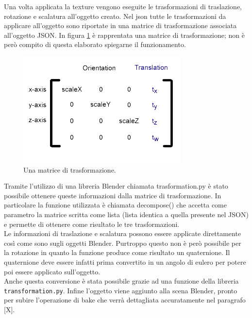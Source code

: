 Una volta applicata la texture vengono eseguite le trasformazioni di traslazione, rotazione e scalatura all’oggetto creato.
Nel json tutte le trasformazioni da applicare all’oggetto sono riportate in una matrice di trasformazione associata all’oggetto JSON. In figura \ref{fig:baking_service_matrix} è rapprentata una matrice di trasformazione; non è però compito di questa elaborato spiegarne il funzionamento.
\\
\begin{figure}[htb]
 \centering
 \includegraphics[width=0.6\linewidth]{images/chapter_baking_service/matrix.jpg}\hfill
 \caption[Matrice di trasformazione]{Una matrice di trasformazione.}
 \label{fig:baking_service_matrix}
\end{figure}

Tramite l’utilizzo di una libreria Blender chiamata trasformation.py è stato possibile ottenere queste informazioni dalla matrice di trasformazione. 
In particolare la funzione utilizzata è chiamata decompose() che accetta come parametro la matrice scritta come lista (lista identica a quella presente nel JSON) e permette di ottenere come risultato le tre trasformazioni.
\\
Le informazioni di traslazione e scalatura possono essere applicate direttamente così come sono sugli oggetti Blender. 
Purtroppo questo non è però possibile per la rotazione in quanto la funzione produce come risultato un quaternione. Il quaternione deve essere infatti prima convertito in un angolo di eulero per potere poi essere applicato sull’oggetto. 
\\
Anche questa conversione è stata possibile grazie ad una funzione della libreria \texttt{transformation.py}.
Infine l’oggetto viene aggiunto alla scena Blender, pronto per subire l’operazione di bake che verrà dettagliata accuratamente nel paragrafo [X].


